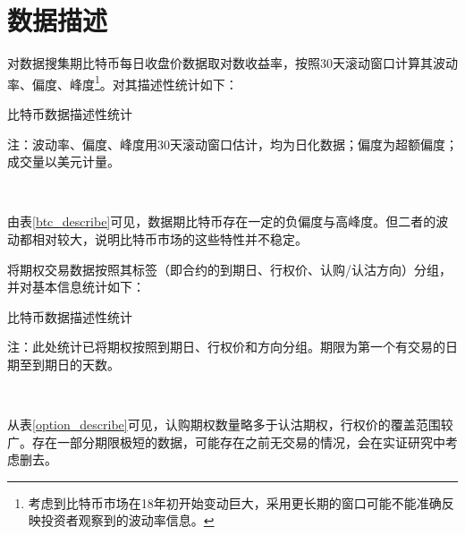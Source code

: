 \section{数据描述}
    \par{
        对数据搜集期比特币每日收盘价数据取对数收益率，按照30天滚动窗口计算其波动率、偏度、峰度\footnote{考虑到比特币市场在18年初开始变动巨大，采用更长期的窗口可能不能准确反映投资者观察到的波动率信息。}。对其描述性统计如下：}

        \begin{threeparttable}[H]
            
            \centering
            \caption{比特币数据描述性统计}
            \label{btc_describe}
            
            \begin{tablenotes}
                \footnotesize
                \item 注：波动率、偏度、峰度用30天滚动窗口估计，均为日化数据；偏度为超额偏度；成交量以美元计量。
            \end{tablenotes}
        \end{threeparttable}
        
    
    ~\\
    \par{
        
        由表\ref{btc_describe}可见，数据期比特币存在一定的负偏度与高峰度。但二者的波动都相对较大，说明比特币市场的这些特性并不稳定。
    }
    \newpage
    \par{
        将期权交易数据按照其标签（即合约的到期日、行权价、认购/认沽方向）分组，并对基本信息统计如下：
    }
    \par{
    \begin{threeparttable}[H]
  
        \centering
        \caption{比特币数据描述性统计}
        \label{option_describe}
        
        \begin{tablenotes}
            \footnotesize
            \item 注：此处统计已将期权按照到期日、行权价和方向分组。期限为第一个有交易的日期至到期日的天数。
        \end{tablenotes}
    \end{threeparttable}
    }
    ~\\
    \par{
    从表\ref{option_describe}可见，认购期权数量略多于认沽期权，行权价的覆盖范围较广。存在一部分期限极短的数据，可能存在之前无交易的情况，会在实证研究中考虑删去。
    }